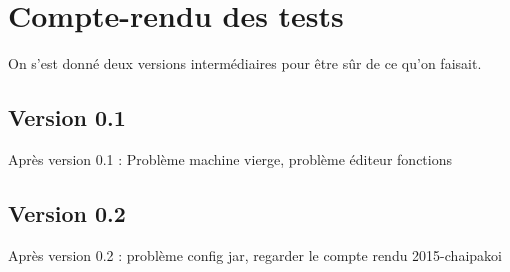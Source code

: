\section{Compte-rendu des tests}

On s'est donné deux versions intermédiaires pour être sûr de ce qu'on faisait.
\subsection{Version 0.1}
Après version 0.1 : Problème machine vierge, problème éditeur fonctions

\subsection{Version 0.2}
Après version 0.2 : problème config jar, regarder le compte rendu 2015-chaipakoi